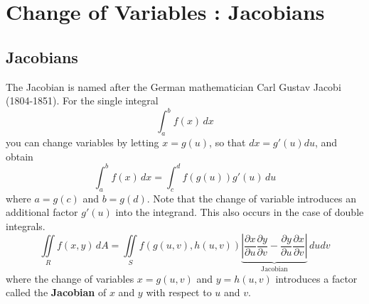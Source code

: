 \documentclass[titlepage,a4paper,12pt]{report}
\begin{document}
\section{Change of Variables : Jacobians}
\subsection{Jacobians}
The Jacobian is named after the German mathematician Carl Gustav Jacobi (1804-1851). For the single integral 
\[\int _a^b f(x)\, dx\] you can change variables by letting $x=g(u)$, so that $dx=g'(u)du$, and obtain 
\[\int _a^b f(x)\, dx = \int _c^d f(g(u))g'(u)\, du\] where $a=g(c)$ and $b=g(d)$. Note that the change of variable introduces an additional factor $g'(u)$ into the integrand. This also occurs in the case of double integrals.
\[\iint \limits _R f(x,y)\, dA =\iint \limits _S f(g(u,v), h(u,v))\underbrace{\left |\dfrac{\partial x}{\partial u}\dfrac{\partial y}{\partial v}-\dfrac{\partial y}{\partial u}\dfrac{\partial x}{\partial v}\right|}_{\mbox{Jacobian}}\, dudv\] where the change of variables $x=g(u,v)$ and $y=h(u,v)$ introduces a factor called the \textbf{Jacobian} of $x$ and $y$ with respect to $u$ and $v$.
\end{document}
